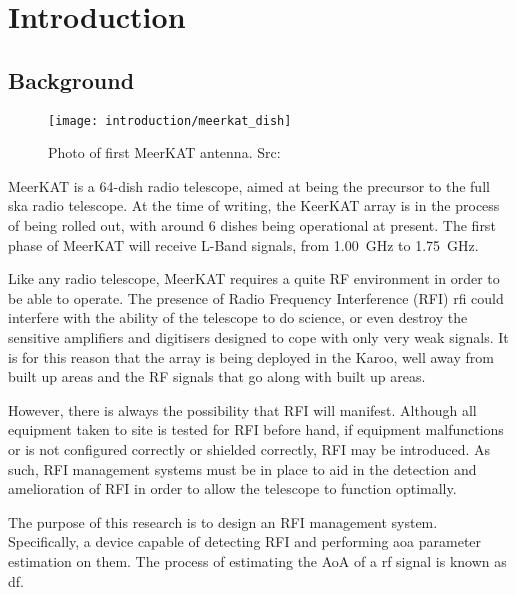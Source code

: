 \chapter{Introduction}
\section{Background}
\begin{wrapfigure}{r}{0.4\textwidth}
  \begin{center}
    \texttt{[image: introduction/meerkat\_dish]}
  \end{center}
  \caption{Photo of first MeerKAT antenna. Src: \cite{skasawebsite}}
\end{wrapfigure}
MeerKAT is a 64-dish radio telescope, aimed at being the precursor to the full \gls{ska} radio telescope. At the time of writing, the KeerKAT array is in the process of being rolled out, with around 6 dishes being operational at present.
The first phase of MeerKAT will receive L-Band signals, from \SI{1.00}{\giga\hertz} to \SI{1.75}{\giga\hertz}. 

Like any radio telescope, MeerKAT requires a quite RF environment in order to be able to operate. 
The presence of Radio Frequency Interference (RFI) \gls{rfi} could interfere with the ability of the telescope to do science, or even destroy the sensitive amplifiers and digitisers designed to cope with only very weak signals.
It is for this reason that the array is being deployed in the Karoo, well away from built up areas and the RF signals that go along with built up areas. 

However, there is always the possibility that RFI will manifest. 
Although all equipment taken to site is tested for RFI before hand, if equipment malfunctions or is not configured correctly or shielded correctly, RFI may be introduced.
As such, RFI management systems must be in place to aid in the detection and amelioration of RFI in order to allow the telescope to function optimally.

The purpose of this research is to design an RFI management system. 
Specifically, a device capable of detecting RFI and performing \gls{aoa} parameter estimation on them. 
The process of estimating the AoA of a \gls{rf} signal is known as \gls{df}.



